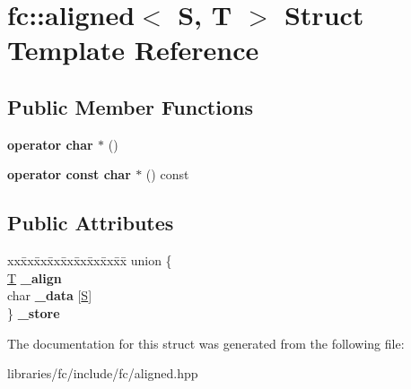\hypertarget{structfc_1_1aligned}{}\section{fc\+:\+:aligned$<$ S, T $>$ Struct Template Reference}
\label{structfc_1_1aligned}
\subsection*{Public Member Functions}
\begin{DoxyCompactItemize}
\item 
\mbox{\label{structfc_1_1aligned_abdb26112a6a3eb3817e97e8d3aa5c66c}} 
{\bfseries operator char $\ast$} ()
\item 
\mbox{\label{structfc_1_1aligned_a4feb204641ac94d6458cd9bfe05cc922}} 
{\bfseries operator const char $\ast$} () const
\end{DoxyCompactItemize}
\subsection*{Public Attributes}
\begin{DoxyCompactItemize}
\item 
\mbox{\label{structfc_1_1aligned_a7277c027c8777ad2e384ef6eb31c8d96}} 
\begin{tabbing}
xx\=xx\=xx\=xx\=xx\=xx\=xx\=xx\=xx\=\kill
union \{\\
\>\mbox{\hyperlink{struct_t}{T}} {\bfseries \_align}\\
\>char {\bfseries \_data} \mbox{[}\mbox{\hyperlink{struct_s}{S}}\mbox{]}\\
\} {\bfseries \_store}\\

\end{tabbing}\end{DoxyCompactItemize}


The documentation for this struct was generated from the following file\+:\begin{DoxyCompactItemize}
\item 
libraries/fc/include/fc/aligned.\+hpp\end{DoxyCompactItemize}
